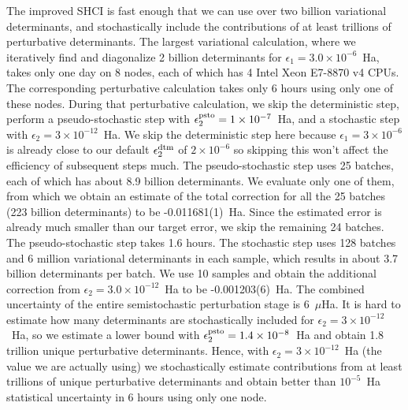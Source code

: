 \documentclass[%
reprint,
 superscriptaddress,
 amsmath,amssymb,
 aps,
]{revtex4-1}
\begin{document}
The improved SHCI is fast enough that we can use over two billion variational determinants, and stochastically include the contributions of at least trillions of perturbative determinants.
The largest variational calculation, where we iteratively find and diagonalize 2 billion determinants
for $\epsilon_1=3.0\times10^{-6}$~Ha, takes only one day on 8 nodes, each of which has 4 Intel Xeon E7-8870 v4 CPUs.
The corresponding perturbative calculation takes only 6 hours using only one of these nodes. 
During that perturbative calculation, we skip the deterministic step, perform a pseudo-stochastic step with $\epsilon_2^{\rm psto}=1\times10^{-7}$~Ha, and a stochastic step with $\epsilon_2=3\times10^{-12}$~Ha.
{\color{black}
We skip the deterministic step here because $\epsilon_1=3 \times 10^{-6}$ is already close to our
default $\epsilon_2^{\rm dtm}$ of $2 \times 10^{-6}$ so skipping this won't affect the efficiency
of subsequent steps much.
}
The pseudo-stochastic step uses 25 batches, each of which has about 8.9 billion determinants.
We evaluate only one of them, from which we obtain an estimate of the total correction for all the 25 batches (223 billion determinants) to be -0.011681(1)~Ha.
Since the estimated error is already much smaller than our target error, we skip the remaining 24 batches.
The pseudo-stochastic step takes 1.6 hours.
The stochastic step uses 128 batches and 6 million variational determinants in each sample,
which results in about 3.7 billion determinants per batch.
We use 10 samples and obtain the additional correction from $\epsilon_2=3.0\times10^{-12}$~Ha to be -0.001203(6)~Ha.
The combined uncertainty of the entire semistochastic perturbation stage is 6~$\mu$Ha.
It is hard to estimate how many determinants are stochastically included for $\epsilon_2=3\times10^{-12}$~Ha,
so we estimate a lower bound with $\epsilon_2^{\rm psto}=1.4\times10^{-8}$~Ha and obtain 1.8 trillion unique perturbative determinants.
Hence, with $\epsilon_2=3\times10^{-12}$~Ha (the value we are actually using) we stochastically estimate contributions from
at least trillions of unique perturbative determinants and obtain better than $10^{-5}$~Ha statistical uncertainty in 6 hours using only one node.
\end{document}
